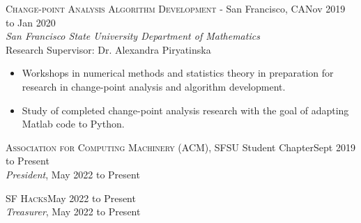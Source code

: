 \documentclass[hidelinks, 10pt]{article}
\begin{document}
{{\vspace{4mm}
\pagebreak


\begin{minipage}[ct]{0.9\linewidth}
{\textsc{Change-point Analysis Algorithm Development} - San Francisco, CA}\hfill Nov 2019 to Jan 2020\\
\emph{San Francisco State University Department of Mathematics}\\
Research Supervisor: Dr. Alexandra Piryatinska
    \makeatletter
    \let\orig@listi\@listi
    \def\@listi{\orig@listi\topsep=0.25\baselineskip}
    \makeatother
    \begin{itemize}
        \setlength\itemsep{-0.25em}
        \item Workshops in numerical methods and statistics theory in
        preparation for research in change-point analysis and algorithm
        development.
        \item Study of completed change-point analysis research with the goal of
        adapting Matlab code to Python.
    \end{itemize}
\end{minipage}

}

\vspace{6mm}

\hrulefill

\vspace{5mm}

\begin{minipage}[ct]{0.9\linewidth}
\textsc{Association for Computing Machinery} (ACM), SFSU Student Chapter\hfill Sept 2019 to
Present\\
\emph{President}, May 2022 to Present

\vspace{1.5mm}

\textsc{SF Hacks}\hfill May 2022 to Present\\
\emph{Treasurer}, May 2022 to Present

\vspace{1.5mm}


\end{minipage}}
\end{document}
